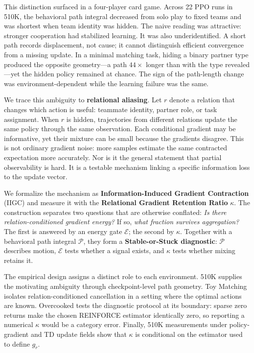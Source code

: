 \documentclass[letterpaper]{article}
\begin{document}
This distinction surfaced in a four-player card game.
Across 22 PPO runs in 510K, the behavioral path integral decreased from solo play to fixed teams and was shortest when team identity was hidden.
The naive reading was attractive: stronger cooperation had stabilized learning.
It was also underidentified.
A short path records displacement, not cause; it cannot distinguish efficient convergence from a missing update.
In a minimal matching task, hiding a binary partner type produced the opposite geometry---a path $44\times$ longer than with the type revealed---yet the hidden policy remained at chance.
The sign of the path-length change was environment-dependent while the learning failure was the same.

We trace this ambiguity to \textbf{relational aliasing}.
Let $r$ denote a relation that changes which action is useful: teammate identity, partner role, or task assignment.
When $r$ is hidden, trajectories from different relations update the same policy through the same observation.
Each conditional gradient may be informative, yet their mixture can be small because the gradients disagree.
This is not ordinary gradient noise: more samples estimate the same contracted expectation more accurately.
Nor is it the general statement that partial observability is hard.
It is a testable mechanism linking a specific information loss to the update vector.

We formalize the mechanism as \textbf{Information-Induced Gradient Contraction} (IIGC) and measure it with the \textbf{Relational Gradient Retention Ratio} $\kappa$.
The construction separates two questions that are otherwise conflated:
\emph{Is there relation-conditioned gradient energy?}
If so, \emph{what fraction survives aggregation?}
The first is answered by an energy gate $\mathcal{E}$; the second by $\kappa$.
Together with a behavioral path integral $\mathcal{P}$, they form a \textbf{Stable-or-Stuck diagnostic}: $\mathcal{P}$ describes motion, $\mathcal{E}$ tests whether a signal exists, and $\kappa$ tests whether mixing retains it.

The empirical design assigns a distinct role to each environment.
510K supplies the motivating ambiguity through checkpoint-level path geometry.
Toy Matching isolates relation-conditioned cancellation in a setting where the optimal actions are known.
Overcooked tests the diagnostic protocol at its boundary: sparse zero returns make the chosen REINFORCE estimator identically zero, so reporting a numerical $\kappa$ would be a category error.
Finally, 510K measurements under policy-gradient and TD update fields show that $\kappa$ is conditional on the estimator used to define $g_r$.
\end{document}
